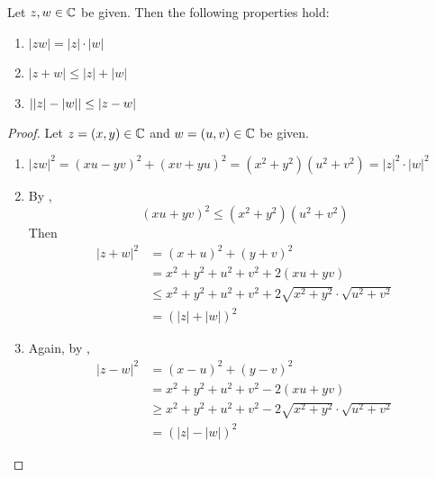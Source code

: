\begin{theorem} \label{an:thm:properties-of-modulus}
    Let $z, w \in \C$ be given. Then the following properties hold:
    \begin{enumerate}[label=\textbf{(\Alph*)}]
        \item $|zw| = |z| \cdot |w|$
        \item $|z + w| \leq |z| + |w|$
        \item $\abs*{|z| - |w|} \leq |z - w|$
    \end{enumerate}
\end{theorem}

\begin{proof}
    Let $z = (x, y) \in \C$ and $w = (u, v) \in \C$ be given.
    \begin{enumerate}[label=\textbf{(\Alph*)}]
        \item $|zw|^{2} = (xu - yv)^{2} + (xv + yu)^{2} = (x^{2} + y^{2})(u^{2} + v^{2}) = |z|^{2} \cdot |w|^{2}$
        \item By ,
        \[
        (xu + yv)^{2} \leq (x^{2} + y^{2})(u^{2} + v^{2})
        \]
        Then
        \begin{align*}
            |z + w|^{2} &= (x + u)^{2} + (y + v)^{2} \\
            &= x^{2} + y^{2} + u^{2} + v^{2} + 2(xu + yv) \\
            &\leq x^{2} + y^{2} + u^{2} + v^{2} + 2\sqrt{x^{2} + y^{2}} \cdot \sqrt{u^{2} + v^{2}} \\
            &= (|z| + |w|)^{2}
        \end{align*}
        \item Again, by ,
        \begin{align*}
            |z - w|^{2} &= (x - u)^{2} + (y - v)^{2} \\
            &= x^{2} + y^{2} + u^{2} + v^{2} - 2(xu + yv) \\
            &\geq x^{2} + y^{2} + u^{2} + v^{2} - 2\sqrt{x^{2} + y^{2}} \cdot \sqrt{u^{2} + v^{2}} \\
            &= (|z| - |w|)^{2}
        \end{align*}
    \end{enumerate}
\end{proof}
